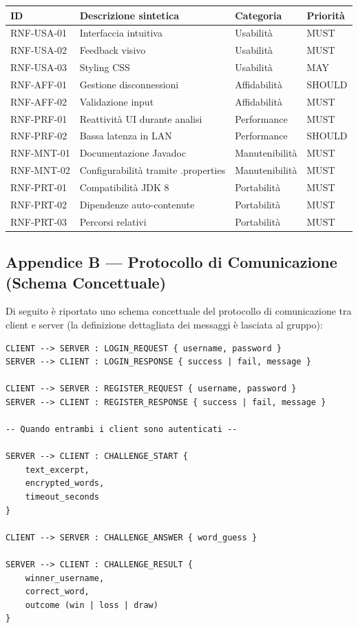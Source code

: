 \documentclass[12pt, a4paper]{article}
\begin{document}
\begin{longtable}{|p{2.5cm}|p{7cm}|p{2.5cm}|p{1.5cm}|}
    \hline
    \rowcolor{primaryBlue!20}
    \textbf{ID} & \textbf{Descrizione sintetica} & \textbf{Categoria} & \textbf{Priorità} \\
    \hline
    \endhead
    RNF-USA-01 & Interfaccia intuitiva & Usabilità & MUST \\
    \hline
    RNF-USA-02 & Feedback visivo & Usabilità & MUST \\
    \hline
    RNF-USA-03 & Styling CSS & Usabilità & MAY \\
    \hline
    RNF-AFF-01 & Gestione disconnessioni & Affidabilità & SHOULD \\
    \hline
    RNF-AFF-02 & Validazione input & Affidabilità & MUST \\
    \hline
    RNF-PRF-01 & Reattività UI durante analisi & Performance & MUST \\
    \hline
    RNF-PRF-02 & Bassa latenza in LAN & Performance & SHOULD \\
    \hline
    RNF-MNT-01 & Documentazione Javadoc & Manutenibilità & MUST \\
    \hline
    RNF-MNT-02 & Configurabilità tramite .properties & Manutenibilità & MUST \\
    \hline
    RNF-PRT-01 & Compatibilità JDK 8 & Portabilità & MUST \\
    \hline
    RNF-PRT-02 & Dipendenze auto-contenute & Portabilità & MUST \\
    \hline
    RNF-PRT-03 & Percorsi relativi & Portabilità & MUST \\
    \hline
\end{longtable}

\subsection{Appendice B — Protocollo di Comunicazione (Schema Concettuale)}

Di seguito è riportato uno schema concettuale del protocollo di comunicazione tra client e server (la definizione dettagliata dei messaggi è lasciata al gruppo):

\begin{lstlisting}[language={}, caption={Flusso messaggi client-server}]
CLIENT --> SERVER : LOGIN_REQUEST { username, password }
SERVER --> CLIENT : LOGIN_RESPONSE { success | fail, message }

CLIENT --> SERVER : REGISTER_REQUEST { username, password }
SERVER --> CLIENT : REGISTER_RESPONSE { success | fail, message }

-- Quando entrambi i client sono autenticati --

SERVER --> CLIENT : CHALLENGE_START {
    text_excerpt,
    encrypted_words,
    timeout_seconds
}

CLIENT --> SERVER : CHALLENGE_ANSWER { word_guess }

SERVER --> CLIENT : CHALLENGE_RESULT {
    winner_username,
    correct_word,
    outcome (win | loss | draw)
}
\end{lstlisting}
\end{document}
